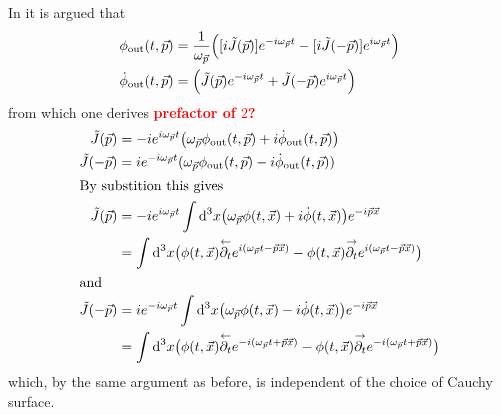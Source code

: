 In \cite{Amelino-CameliaEtAl_1997} it is argued that
\begin{subequations}
    \begin{align}
        \phi_{\text{out}}(t,\vec{p})&=\frac{1}{\omega_{\vec{p}}}\Big([{i} \tilde{J}(\vec{p})]e^{-{i}\omega_{\vec{p}}t}-[{i} \tilde{J}(-\vec{p})]e^{{i}\omega_{\vec{p}}t}\Big)\\
        \dot{\phi}_{\text{out}}(t,\vec{p})&=\Big(\tilde{J}(\vec{p})e^{-{i}\omega_{\vec{p}}t}+\tilde{J}(-\vec{p})e^{{i}\omega_{\vec{p}}t}\Big)
    \end{align}
\end{subequations}
    from which one derives \textbf{\textcolor{red}{prefactor of $2$?}}
\begin{subequations}
    \begin{align}
        \tilde{J}(\vec{p}) & =-{i} e^{{i}\omega_{\vec{p}}t}\big(\omega_{\vec{p}} \phi_{\text{out}}(t,\vec{p})+{i}\dot{\phi}_{\text{out}}(t,\vec{p})\big)                                                                         \\
        \tilde{J}(-\vec{p})&={i} e^{-{i}\omega_{\vec{p}}t}(\omega_{\vec{p}}\phi_{\text{out}}(t,\vec{p})-{i}\dot{\phi}_{\text{out}}(t,\vec{p}))\\
        \intertext{By substition this gives}
        \tilde{J}(\vec{p}) & =-{i} e^{{i}\omega_{\vec{p}}t}\int\text{d}^3x\big(\omega_{\vec{p}}\phi(t,\vec{x})+{i}\dot{\phi}(t,\vec{x})\big)e^{-{i}\vec{p}\vec{x}}                                                                  \\
                           & =\int\text{d}^3x\big(\phi(t,\vec{x})\overset{\leftarrow}{\partial_t}e^{{i}(\omega_{\vec{p}}t-\vec{p}\vec{x})}-\phi(t,\vec{x})\overset{\rightarrow}{\partial_t}e^{{i}(\omega_{\vec{p}}t-\vec{p}\vec{x})}\big)\\
                           \intertext{and}
        \tilde{J}(-\vec{p})&={i} e^{-{i}\omega_{\vec{p}}t}\int\text{d}^3x\big(\omega_{\vec{p}}\phi(t,\vec{x})-{i}\dot{\phi}(t,\vec{x})\big)e^{-{i}\vec{p}\vec{x}}\\
        &=\int\text{d}^3x\big(\phi(t,\vec{x})\overset{\leftarrow}{\partial_t}e^{-{i}(\omega_{\vec{p}}t+\vec{p}\vec{x})}-\phi(t,\vec{x})\overset{\rightarrow}{\partial_t}e^{-{i}(\omega_{\vec{p}}t+\vec{p}\vec{x})}\big)
    \end{align}
\end{subequations}
which, by the same argument as before, is independent of the choice of Cauchy surface.

